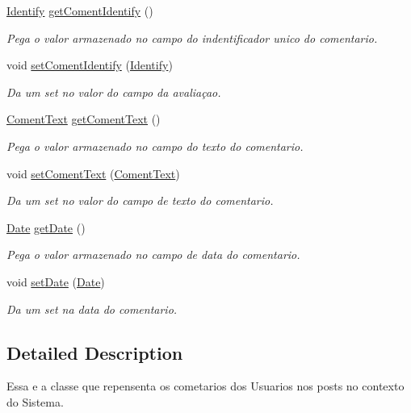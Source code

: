 \begin{DoxyCompactItemize}
\hyperlink{class_identify}{Identify} \hyperlink{class_coment_a6a57b7f20c9a0a4331f12b7058980b99}{get\-Coment\-Identify} ()
\begin{DoxyCompactList}\small\item\em Pega o valor armazenado no campo do indentificador unico do comentario. \end{DoxyCompactList}\item 
void \hyperlink{class_coment_ab980dae53d71c2c43d639482273e2032}{set\-Coment\-Identify} (\hyperlink{class_identify}{Identify})
\begin{DoxyCompactList}\small\item\em Da um set no valor do campo da avaliaçao. \end{DoxyCompactList}\item 
\hyperlink{class_coment_text}{Coment\-Text} \hyperlink{class_coment_a9d8b854216fe9e0c22d9daf58ac91d66}{get\-Coment\-Text} ()
\begin{DoxyCompactList}\small\item\em Pega o valor armazenado no campo do texto do comentario. \end{DoxyCompactList}\item 
void \hyperlink{class_coment_aee3806f744c85b8759d78caf327288a9}{set\-Coment\-Text} (\hyperlink{class_coment_text}{Coment\-Text})
\begin{DoxyCompactList}\small\item\em Da um set no valor do campo de texto do comentario. \end{DoxyCompactList}\item 
\hyperlink{class_date}{Date} \hyperlink{class_coment_a531f1b46ea41684e718b40ea48efde24}{get\-Date} ()
\begin{DoxyCompactList}\small\item\em Pega o valor armazenado no campo de data do comentario. \end{DoxyCompactList}\item 
void \hyperlink{class_coment_ad2faca7f8d5bac7538a9b5cde9642c46}{set\-Date} (\hyperlink{class_date}{Date})
\begin{DoxyCompactList}\small\item\em Da um set na data do comentario. \end{DoxyCompactList}\end{DoxyCompactItemize}


\subsection{Detailed Description}
Essa e a classe que repensenta os cometarios dos Usuarios nos posts no contexto do Sistema. 

